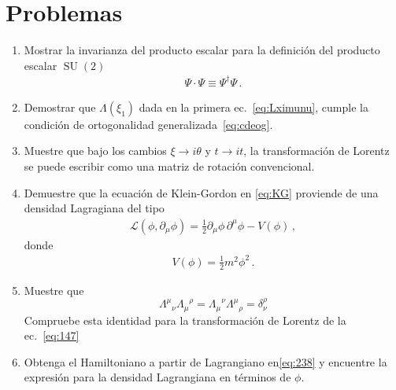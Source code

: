   
 



\section{Problemas}
\label{sec:problemas-2}
\renewcommand{\labelenumi}{\thechapter.\theenumi} %
\begin{enumerate}
\item  Mostrar la invarianza del producto escalar para la definición del producto escalar $\operatorname{SU}(2)$
\begin{align}
   \Psi\cdot \Psi \equiv \Psi^{\dagger}\Psi\,.
\end{align}

\item Demostrar que $\Lambda(\xi_1)$ dada en la primera ec.~\eqref{eq:Lximunu},  cumple la condición de ortogonalidad generalizada~\eqref{eq:cdeog}.

\item Muestre que bajo los cambios $\xi\to i\theta$ y $t\to it$, la transformación de Lorentz se puede escribir como una matriz de rotación convencional.

\item  Demuestre que la ecuación de Klein-Gordon en \eqref{eq:KG} proviende de una densidad Lagragiana del tipo
\begin{align}
  \mathcal{L}(\phi,\partial_{\mu} \phi)=  \frac{1}{2}{\partial_\mu\phi}\,{\partial^\mu\phi}-V(\phi)\,,
\end{align}
donde
\begin{align}
  V(\phi)=\frac{1}{2}m^2 \phi^2\,.
\end{align}

  
  
\item Muestre que
  \begin{equation*}
    {\Lambda^{\mu}}_{\nu}{\Lambda_\mu}^{\rho}={\Lambda_{\mu}}^{\nu}{\Lambda^{\mu}}_{\rho}=\delta^\rho_\nu
  \end{equation*}
Compruebe esta identidad para la transformaci\'on de Lorentz de la ec.~\eqref{eq:147}
\label{item:pch2.1} %

  
\item Obtenga el Hamiltoniano a partir de Lagrangiano en\eqref{eq:238} y encuentre la expresi\'on para la densidad Lagrangiana en t\'erminos de $\phi$.
\label{item:pch1.0} %




\end{enumerate}
